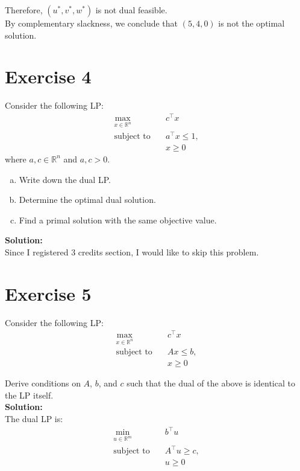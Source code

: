 \documentclass{article}
\begin{document}
Therefore, $(u^*, v^*, w^*)$ is not dual feasible. \\

By complementary slackness, we conclude that $(5,4,0)$ is not the optimal solution.

\newpage

\section*{Exercise 4}
Consider the following LP:
\begin{align*}
\max_{x \in \mathbb{R}^n} \quad & c^{\top} x \\
\text{subject to} \quad & a^{\top} x \leq 1, \\
& x \geq 0
\end{align*}
where $a, c \in \mathbb{R}^n$ and $a, c > 0$.

\begin{enumerate}[(a)]
    \item Write down the dual LP.
    \item Determine the optimal dual solution.
    \item Find a primal solution with the same objective value.
\end{enumerate}

\textbf{Solution:} \\

Since I registered 3 credits section, I would like to skip this problem.

\newpage

\section*{Exercise 5}
Consider the following LP:
\begin{align*}
\max_{x \in \mathbb{R}^n} \quad & c^{\top} x \\
\text{subject to} \quad & Ax \leq b, \\
& x \geq 0
\end{align*}

Derive conditions on $A$, $b$, and $c$ such that the dual of the above is identical to the LP itself. \\

\textbf{Solution:} \\

The dual LP is:
\begin{align*}
\min_{u \in \mathbb{R}^m} \quad & b^{\top} u \\
\text{subject to} \quad & A^{\top} u \geq c, \\
& u \geq 0
\end{align*}
\end{document}
